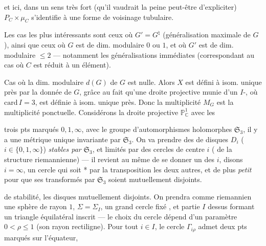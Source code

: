 \documentclass[11pt,a4paper]{article}
\begin{document}

et ici, dans un sens très fort (qu'il vaudrait la peine peut-être
d'expliciter) $P_C \times \mu_C$ s'identifie à une forme de voisinage
tubulaire. 

Les cas les plus intéressants sont ceux où $G' = G^{\natural}$ (généralisation
maximale de $G$), ainsi que ceux où $G$ est de dim. modulaire $0$ ou $1$,
\struck{\ill{}} et où $G'$ est de dim. modulaire $\leq 2$ — notamment les
généralisations immédiates (correspondant au cas où $C$ est réduit à un
élément).

Cas où la dim. modulaire $d(G)$ de $G$ est nulle.
Alors $X$ est défini à isom. unique près par la donnée de $G$, grâce au fait
qu'une droite projective munie d'un \struck{\ill{}} $I$-,
où $\mathrm{card}\, I = 3$, est définie à isom. unique près. Donc la
multiplicité $M_G$ est la multiplicité ponctuelle. Considérons la droite
projective $\mathbb{P}^1_{\mathbb{C}}$  avec les

trois pts marqués $0, 1, \infty$, avec le groupe d'automorphismes
holomorphes $\mathfrak{S}_3$, il y a une métrique 
\add{\ill{}}  unique invariante par $\mathfrak{S}_3$. On va
prendre des  de disques $D_i$ ($i \in \{0,1,\infty\}$)
\textit{stables par} $\mathfrak{S}_3$, et  limités par des
cercles de centre $i$ ( \struck{\ill{}} de la structure
riemannienne) — il revient au même de se donner un des $i$, disons
$i = \infty$, un cercle  qui soit
* par la transposition  les deux
autres, et de plus \textit{petit} pour que ses  transformés par
$\mathfrak{S}_3$ soient mutuellement disjoints.

\ill{} de stabilité, \struck{\ill{}}  les disques
mutuellement disjoints. On prendra comme  riemannien
une sphère  \struck{$\Sigma$} \struck{\ill{}} de rayon $1$,
$\Sigma = \Sigma_I$, un grand cercle fixé , et
\struck{\ill{}}  
partie $I$ dessus formant un triangle équilatéral inscrit — le choix du
cercle dépend d'un paramètre $0 < \rho \leq 1$ (son rayon rectiligne). Pour
tout $i \in I$, le cercle $\Gamma_{i\rho}$ admet deux pts marqués sur
l'équateur, \struck{\ill{}} 
\end{document}
